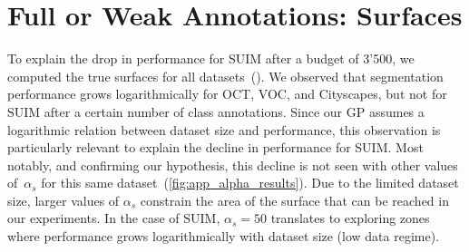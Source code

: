 \section{Full or Weak Annotations: Surfaces}
\label{sec:surfaces}

To explain the drop in performance for SUIM after a budget of 3'500, we computed the true surfaces for all datasets~(). We observed that segmentation performance grows logarithmically for OCT, VOC, and Cityscapes, but not for SUIM after a certain number of class annotations. Since our GP assumes a logarithmic relation between dataset size and performance, this observation is particularly relevant to explain the decline in performance for SUIM. Most notably, and confirming our hypothesis, this decline is not seen with other values of~$\alpha_s$ for this same dataset~(\cref{fig:app_alpha_results}). Due to the limited dataset size, larger values of $\alpha_s$ constrain the area of the surface that can be reached in our experiments. In the case of SUIM, $\alpha_s = 50$ translates to exploring zones where performance grows logarithmically with dataset size (low data regime).


